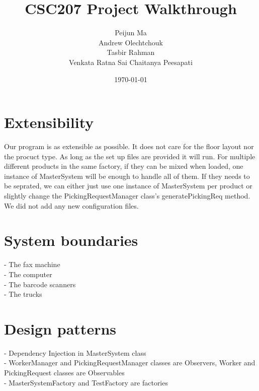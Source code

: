 \documentclass[12pt]{article}
\title{CSC207 Project Walkthrough}
\author{Peijun Ma\\Andrew Olechtchouk\\Tasbir Rahman\\Venkata Ratna Sai Chaitanya Peesapati}
\date{\today}
\begin{document}
    \maketitle
    \pagebreak

\section*{Extensibility}
    Our program is as extensible as possible. It does not care for the floor layout nor the procuct type. As long as the set up files are provided it will run. For multiple different products in the same factory, if they can be mixed when loaded, one instance of MasterSystem will be enough to handle all of them. If they needs to be seprated, we can either just use one instance of MasterSystem per product or slightly change the PickingRequestManager class's generatePickingReq method. We did not add any new configuration files.
\pagebreak
\section*{System boundaries}
    - The fax machine\\
    - The computer\\
    - The barcode scanners\\
    - The trucks
\pagebreak
\section*{Design patterns}
- Dependency Injection in MasterSystem class\\
- WorkerManager and PickingRequestManager classes are Observers, Worker and PickingRequest classes are Observables\\
- MasterSystemFactory and TestFactory are factories\\
\pagebreak
\end{document}
